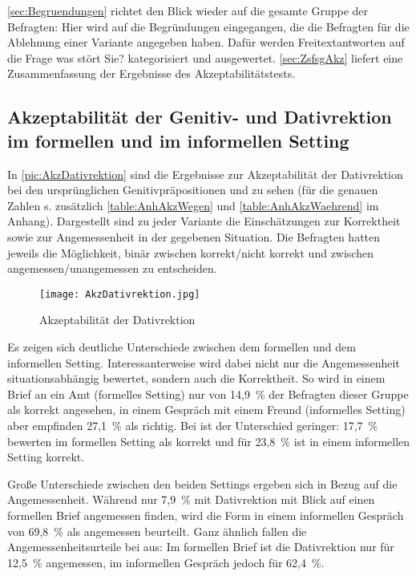 \autoref{sec:Begruendungen} richtet den Blick wieder auf die gesamte Gruppe der Befragten: 
Hier wird auf die Begründungen eingegangen, die die Befragten für die Ablehnung einer Variante angegeben haben. 
Dafür werden Freitextantworten auf die Frage \glqq was stört Sie?\grqq{} kategorisiert und ausgewertet. 
\autoref{sec:ZsfsgAkz} liefert eine Zusammenfassung der Ergebnisse des Akzeptabilitätstests. 
\subsection{Akzeptabilität der Genitiv- und Dativrektion im formellen und im informellen Setting} 
\label{sec:ErgAkzallg}
In \autoref{pic:AkzDativrektion} sind die Ergebnisse zur Akzeptabilität der Dativrektion bei den ursprünglichen Genitivpräpositionen \wegen{} und \waehrend{} zu sehen (für die genauen Zahlen s. zusätzlich \autoref{table:AnhAkzWegen} und \autoref{table:AnhAkzWaehrend} im Anhang). 
Dargestellt sind zu jeder Variante die Einschätzungen zur Korrektheit sowie zur Angemessenheit in der gegebenen Situation. 
Die Befragten hatten jeweils die Möglichkeit, binär zwischen \glqq korrekt\grqq /\glqq nicht korrekt\grqq{} und zwischen \glqq angemessen\grqq /\glqq unangemessen\grqq{} zu entscheiden. 
\begin{figure}
\centering
\texttt{[image: AkzDativrektion.jpg]}
\caption{Akzeptabilität der Dativrektion}
\label{pic:AkzDativrektion}
\end{figure}

Es zeigen sich deutliche Unterschiede zwischen dem formellen und dem informellen Setting. 
Interessanterweise wird dabei nicht nur die Angemessenheit situationsabhängig bewertet, sondern auch die Korrektheit. 
So wird  in einem Brief an ein Amt (formelles Setting) nur von 14,9~\% der Befragten dieser Gruppe als korrekt angesehen, in einem Gespräch mit einem Freund (informelles Setting) aber empfinden 27,1~\%  als richtig. 
Bei \waehrend{} ist der Unterschied geringer: 17,7~\% bewerten  im formellen Setting als korrekt und für 23,8~\% ist  in einem informellen Setting korrekt. 

Große Unterschiede zwischen den beiden Settings ergeben sich in Bezug auf die Angemessenheit. 
Während nur 7,9~\% \wegen{} mit Dativrektion mit Blick auf einen formellen Brief angemessen finden, wird die Form in einem informellen Gespräch von 69,8~\% als angemessen beurteilt. 
Ganz ähnlich fallen die Angemessenheitsurteile bei \waehrend{} aus: Im formellen Brief ist die Dativrektion nur für 12,5~\% angemessen, im informellen Gespräch jedoch für 62,4~\%. 

